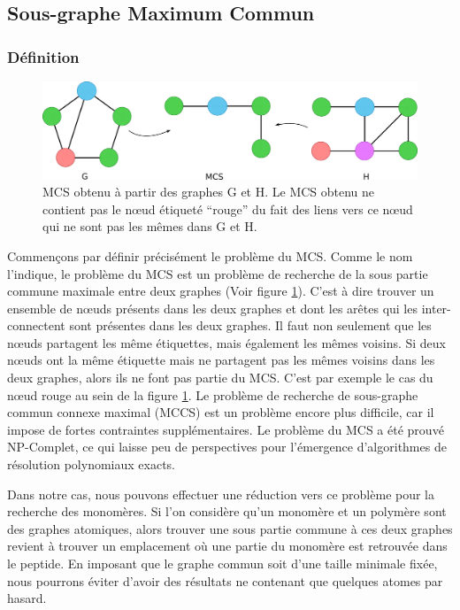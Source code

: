\subsection{Sous-graphe Maximum Commun}

\subsubsection{Définition}

\begin{figure}[!ht]
  \begin{center}
    \includegraphics[width=450px]{Figures/s2m/MCS-SI/mcs.png}
    \caption{\label{mcs_fig}MCS obtenu à partir des graphes G et H.
    Le MCS obtenu ne contient pas le n\oe{}ud étiqueté ``rouge'' du fait des liens vers ce n\oe{}ud qui ne sont pas les mêmes dans G et H.}
  \end{center}
\end{figure}

Commençons par définir précisément le problème du MCS.
Comme le nom l'indique, le problème du MCS est un problème de recherche de la sous partie commune maximale entre deux graphes (Voir figure \ref{mcs_fig}).
C'est à dire trouver un ensemble de n\oe{}uds présents dans les deux graphes et dont les arêtes qui les inter-connectent sont présentes dans les deux graphes.
Il faut non seulement que les n\oe{}uds partagent les même étiquettes, mais également les mêmes voisins.
Si deux n\oe{}uds ont la même étiquette mais ne partagent pas les mêmes voisins dans les deux graphes, alors ils ne font pas partie du MCS.
C'est par exemple le cas du n\oe{}ud rouge au sein de la figure \ref{mcs_fig}.
Le problème de recherche de sous-graphe commun connexe maximal (MCCS) est un problème encore plus difficile, car il impose de fortes contraintes supplémentaires.
Le problème du MCS a été prouvé NP-Complet\cite{garey_computers_1979}, ce qui laisse peu de perspectives pour l'émergence d'algorithmes de résolution polynomiaux exacts.

Dans notre cas, nous pouvons effectuer une réduction vers ce problème pour la recherche des monomères.
Si l'on considère qu'un monomère et un polymère sont des graphes atomiques, alors trouver une sous partie commune à ces deux graphes revient à trouver un emplacement où une partie du monomère est retrouvée dans le peptide.
En imposant que le graphe commun soit d'une taille minimale fixée, nous pourrons éviter d'avoir des résultats ne contenant que quelques atomes par hasard.

